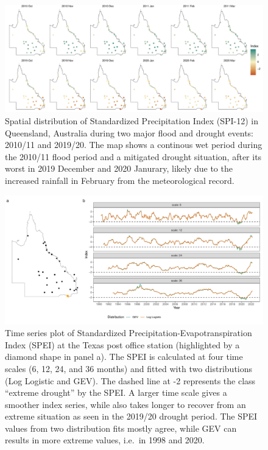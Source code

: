 \documentclass[
]{article}
\begin{document}
\begin{figure}

{\centering \includegraphics{paper_files/figure-pdf/fig-compute-spatial-1.pdf}

}

\caption{\label{fig-compute-spatial}Spatial distribution of Standardized
Precipitation Index (SPI-12) in Queensland, Australia during two major
flood and drought events: 2010/11 and 2019/20. The map shows a continous
wet period during the 2010/11 flood period and a mitigated drought
situation, after its worst in 2019 December and 2020 Janurary, likely
due to the increased rainfall in February from the meteorological
record.}

\end{figure}

\begin{figure}

{\centering \includegraphics{paper_files/figure-pdf/fig-compute-temporal-1.pdf}

}

\caption{\label{fig-compute-temporal}Time series plot of Standardized
Precipitation-Evapotranspiration Index (SPEI) at the Texas post office
station (highlighted by a diamond shape in panel a). The SPEI is
calculated at four time scales (6, 12, 24, and 36 months) and fitted
with two distributions (Log Logistic and GEV). The dashed line at -2
represents the class ``extreme drought'' by the SPEI. A larger time
scale gives a smoother index series, while also takes longer to recover
from an extreme situation as seen in the 2019/20 drought period. The
SPEI values from two distribution fits mostly agree, while GEV can
results in more extreme values, i.e.~in 1998 and 2020.}

\end{figure}
\end{document}
